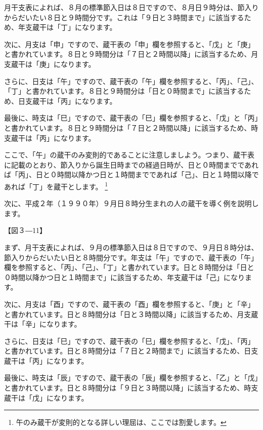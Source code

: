 \documentclass[a5paper,11pt,dvipdfmx]{tarticle}
\begin{document}
月干支表によれば、８月の標準節入日は８日ですので、８月日９時分は、節入りからだいたい８日と９時間分です。これは「９日と３時間まで」に該当するため、年支蔵干は「丁」になります。

次に、月支は「申」ですので、蔵干表の「申」欄を参照すると、「戊」と「庚」と書かれています。８日と９時間分は「７日と２時間以降」に該当するため、月支蔵干は「庚」になります。

さらに、日支は「午」ですので、蔵干表の「午」欄を参照すると、「丙」、「己」、「丁」と書かれています。８日と９時間分は「日と０時間まで」に該当するため、日支蔵干は「丙」になります。

最後に、時支は「巳」ですので、蔵干表の「巳」欄を参照すると、「戊」と「丙」と書かれています。８日と９時間分は「７日と２時間以降」に該当するため、時支蔵干は「丙」になります。

ここで、「午」の蔵干のみ変則的であることに注意しましよう。つまり、蔵干表に記載のとおり、節入りから誕生日時までの経過日時が、日と０時間までであれば「丙」、日と０時間以降かつ日と１時間までであれば「己」、日と１時間以降であれば「丁」を蔵干とします。 \footnote{午のみ蔵干が変則的となる詳しい理屈は、ここでは割愛します。}

次に、平成２年（１９９０年）９月日８時分生まれの人の蔵干を導く例を説明します。

【図３―11】

まず、月干支表によれば、９月の標準節入日は８日ですので、９月日８時分は、節入りからだいたい日と８時間分です。年支は「午」ですので、蔵干表の「午」欄を参照すると、「丙」、「己」、「丁」と書かれています。日と８時間分は「日と０時間以降かつ日と１時間まで」に該当するため、年支蔵干は「己」になります。

次に、月支は「酉」ですので、蔵干表の「酉」欄を参照すると、「庚」と「辛」と書かれています。日と８時間分は「日と３時間以降」に該当するため、月支蔵干は「辛」になります。

さらに、日支は「巳」ですので、蔵干表の「巳」欄を参照すると、「戊」、「丙」と書かれています。日と８時間分は「７日と２時間まで」に該当するため、日支蔵干は「丙」になります。

最後に、時支は「辰」ですので、蔵干表の「辰」欄を参照すると、「乙」と「戊」と書かれています。日と８時間分は「９日と３時間以降」に該当するため、時支蔵干は「戊」になります。
\end{document}
